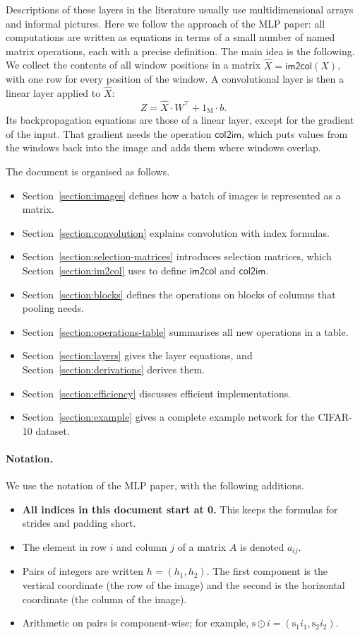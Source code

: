 \documentclass[twoside,11pt]{article}
\newcommand{\const}[1]{\ensuremath{\mathrm{#1}}} %
\newcommand{\func}[1]{\ensuremath{\textsf{#1}}}  %
\newcommand{\cstr}{\const{s}}         %
\newcommand{\im}{\func{im2col}}
\newcommand{\ci}{\func{col2im}}
\begin{document}
Descriptions of these layers in the literature usually use multidimensional arrays and informal pictures.
Here we follow the approach of the MLP paper: all computations are written as equations in terms of a small number of named matrix operations, each with a precise definition.
The main idea is the following.
We collect the contents of all window positions in a matrix $\hat X = \im(X)$, with one row for every position of the window.
A convolutional layer is then a linear layer applied to $\hat X$:
\[
Z = \hat X \cdot W^\top + 1_\const{M} \cdot b.
\]
Its backpropagation equations are those of a linear layer, except for the gradient of the input. That gradient needs the operation \ci{}, which puts values from the windows back into the image and adds them where windows overlap.

The document is organised as follows.
\begin{itemize}
\item Section~\ref{section:images} defines how a batch of images is represented as a matrix.
\item Section~\ref{section:convolution} explains convolution with index formulas.
\item Section~\ref{section:selection-matrices} introduces selection matrices, which Section~\ref{section:im2col} uses to define \im{} and \ci.
\item Section~\ref{section:blocks} defines the operations on blocks of columns that pooling needs.
\item Section~\ref{section:operations-table} summarises all new operations in a table.
\item Section~\ref{section:layers} gives the layer equations, and Section~\ref{section:derivations} derives them.
\item Section~\ref{section:efficiency} discusses efficient implementations.
\item Section~\ref{section:example} gives a complete example network for the CIFAR-10 dataset.
\end{itemize}

\paragraph{Notation.}
We use the notation of the MLP paper, with the following additions.
\begin{itemize}
\item \textbf{All indices in this document start at 0.} This keeps the formulas for strides and padding short.
\item The element in row $i$ and column $j$ of a matrix $A$ is denoted $a_{ij}$.
\item Pairs of integers are written $h = (h_1, h_2)$. The first component is the vertical coordinate (the row of the image) and the second is the horizontal coordinate (the column of the image).
\item Arithmetic on pairs is component-wise; for example, $\cstr \odot i = (\cstr_1 i_1, \cstr_2 i_2)$.
\end{itemize}
\end{document}
